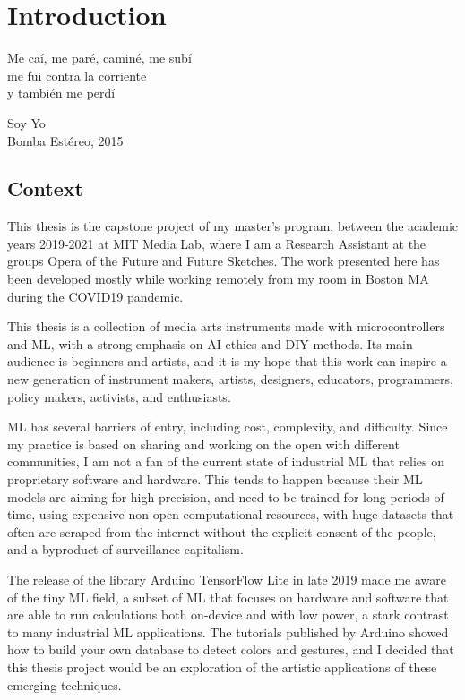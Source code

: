 \chapter{Introduction}

\epigraph{Me caí, me paré, caminé, me subí \\ me fui contra la corriente \\ y también me perdí}{Soy Yo \\ Bomba Estéreo, 2015}

\section{Context}

This thesis is the capstone project of my master's program, between the academic years 2019-2021 at MIT Media Lab, where I am a Research Assistant at the groups Opera of the Future and Future Sketches. The work presented here has been developed mostly while working remotely from my room in Boston MA during the COVID19 pandemic.

This thesis is a collection of media arts instruments made with microcontrollers and \acrfull{ML}, with a strong emphasis on \acrfull{AI} ethics and \acrfull{DIY} methods. Its main audience is beginners and artists, and it is my hope that this work can inspire a new generation of instrument makers, artists, designers, educators, programmers, policy makers, activists, and enthusiasts.

\acrshort{ML} has several barriers of entry, including cost, complexity, and difficulty. Since my practice is based on sharing and working on the open with different communities, I am not a fan of the current state of industrial \acrshort{ML} that relies on proprietary software and hardware. This tends to happen because their ML models are aiming for high precision, and need to be trained for long periods of time, using expensive non open computational resources, with huge datasets that often are scraped from the internet without the explicit consent of the people, and a byproduct of surveillance capitalism.

The release of the library Arduino TensorFlow Lite in late 2019 made me aware of the tiny \acrshort{ML} field, a subset of \acrshort{ML} that focuses on hardware and software that are able to run calculations both on-device and with low power, a stark contrast to many industrial \acrshort{ML} applications. The tutorials published by Arduino showed how to build your own database to detect colors and gestures, and I decided that this thesis project would be an exploration of the artistic applications of these emerging techniques.

